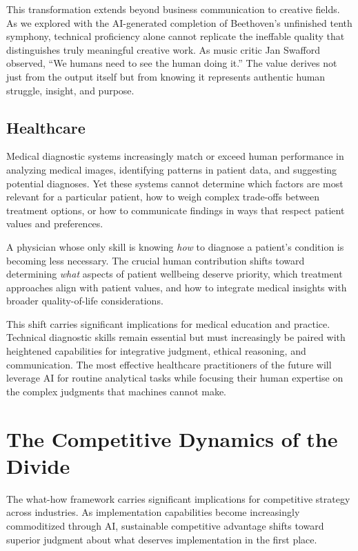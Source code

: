 \documentclass[
  Letterpaper,
]{scrbook}
\begin{document}
This transformation extends beyond business communication to creative
fields. As we explored with the AI-generated completion of
Beethoven's unfinished tenth symphony, technical
proficiency alone cannot replicate the ineffable quality that
distinguishes truly meaningful creative work. As music critic Jan
Swafford observed, ``We humans need to see the human doing it.'' The
value derives not just from the output itself but from knowing it
represents authentic human struggle, insight, and purpose.

\subsection{Healthcare}\label{healthcare}

Medical diagnostic systems increasingly match or exceed human
performance in analyzing medical images, identifying patterns in patient
data, and suggesting potential diagnoses. Yet these systems cannot
determine which factors are most relevant for a particular patient, how
to weigh complex trade-offs between treatment options, or how to
communicate findings in ways that respect patient values and
preferences.

A physician whose only skill is knowing \emph{how} to diagnose a
patient's condition is becoming less necessary. The crucial human
contribution shifts toward determining \emph{what} aspects of patient
wellbeing deserve priority, which treatment approaches align with
patient values, and how to integrate medical insights with broader
quality-of-life considerations.

This shift carries significant implications for medical education and
practice. Technical diagnostic skills remain essential but must
increasingly be paired with heightened capabilities for integrative
judgment, ethical reasoning, and communication. The most effective
healthcare practitioners of the future will leverage AI for routine
analytical tasks while focusing their human expertise on the complex
judgments that machines cannot make.

\section{The Competitive Dynamics of the
Divide}\label{the-competitive-dynamics-of-the-divide}

The what-how framework carries significant implications for competitive
strategy across industries. As implementation capabilities become
increasingly commoditized through AI, sustainable competitive advantage
shifts toward superior judgment about what deserves implementation in
the first place.
\end{document}
